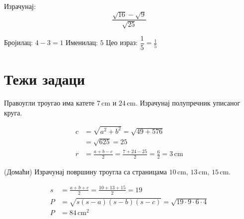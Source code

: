 \documentclass[11pt,a5paper,twoside,addpoints,noanswers]{exam} %
\newcommand{\measure}[2]{\mathrm{#1\,#2}}
\newcommand{\variant}[3]{#1}
\begin{document}
\begin{questions}
\question[3]
Израчунај:
\[
\dfrac{\sqrt{\variant{16}{49}{36}}-\sqrt{\variant{9}{25}{4}}}{\sqrt{\variant{25}{4}{49}}}
\]
\begin{solution}[\stretch 3]
Бројилац: $\variant{4-3}{7-5}{6-2}=\variant{1}{2}{4}$  
Именилац: $\variant{5}{2}{7}$  
Цео израз: $\dfrac{\variant{1}{2}{4}}{\variant{5}{2}{7}}=\variant{\tfrac{1}{5}}{1}{\tfrac{4}{7}}$
\end{solution}

\section{Тежи задаци}

\question[5]
Правоугли троугао има катете
$\measure{\variant{7}{15}{20}}{cm}$ и
$\measure{\variant{24}{8}{21}}{cm}$.  
Израчунај полупречник уписаног круга.
\begin{solution}[\stretch 3]
\begin{align*}
c &= \sqrt{a^2+b^2}=\sqrt{\variant{49+576}{225+64}{400+441}}\\
&=\sqrt{\variant{625}{289}{841}}=\variant{25}{17}{29}\\
r &= \tfrac{a+b-c}{2}=\tfrac{\variant{7+24-25}{15+8-17}{20+21-29}}{2}
=\tfrac{6}{2}=\measure{3}{cm}
\end{align*}
\end{solution}

\question[5]
(Домаћи) Израчунај површину троугла са страницама
$\measure{\variant{10}{7}{9}}{cm}$,
$\measure{\variant{13}{24}{12}}{cm}$,
$\measure{\variant{15}{25}{18}}{cm}$.
\begin{solution}[\stretch 4]
\begin{align*}
s &= \tfrac{a+b+c}{2}=\tfrac{\variant{10+13+15}{7+24+25}{9+12+18}}{2}
=\variant{19}{28}{19,5}\\
P &= \sqrt{s(s-a)(s-b)(s-c)}
=\sqrt{\variant{19\cdot9\cdot6\cdot4}{28\cdot21\cdot4\cdot3}{19,5\cdot10,5\cdot7,5\cdot1,5}}\\
P &= \measure{\variant{84}{84}{\approx56,1}}{cm^2}
\end{align*}
\end{solution}

\end{questions}
\end{document}
